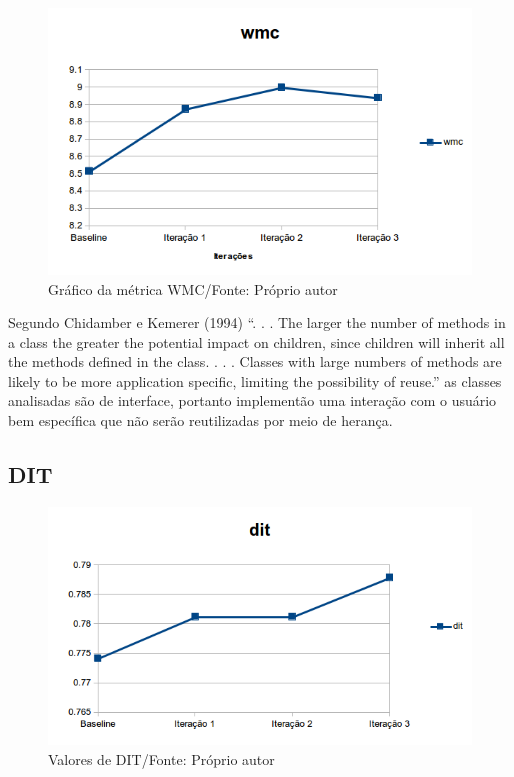 \begin{figure}[h]
	\centering
	\includegraphics{img/wmc.png}
	\caption{Gráfico da métrica WMC/Fonte: Próprio autor} 
	\label{fig:wmc}
\end{figure}


Segundo Chidamber e Kemerer (1994) “. . . The larger the number of methods in
a class the greater the potential impact on children, since children will inherit all the
methods defined in the class. . . . Classes with large numbers of methods are likely to
be more application specific, limiting the possibility of reuse.” as classes analisadas
são de interface, portanto implementão uma interação com o usuário bem
específica que não serão reutilizadas por meio de herança.

\subsection{DIT}


\begin{figure}[h]
	\centering
	\includegraphics{img/dit.png}
	\caption{Valores de DIT/Fonte: Próprio autor}
	\label{fig:dit}
\end{figure}


